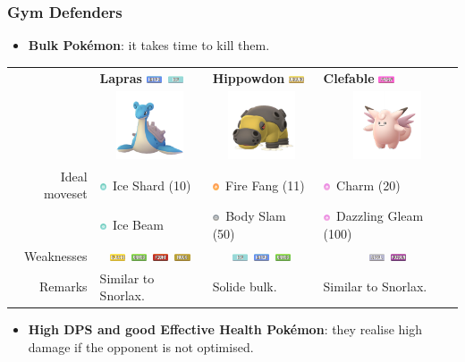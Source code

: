 \documentclass[12pt]{beamer}
\newcommand{\fightingfull}{\includegraphics[height=0.2cm]{../../images/type/full/Fighting.png}}
\newcommand{\electricfull}{\includegraphics[height=0.2cm]{../../images/type/full/Electric.png}}
\newcommand{\fairyfull}{\includegraphics[height=0.2cm]{../../images/type/full/Fairy.png}}
\newcommand{\grassfull}{\includegraphics[height=0.2cm]{../../images/type/full/Grass.png}}
\newcommand{\groundfull}{\includegraphics[height=0.2cm]{../../images/type/full/Ground.png}}
\newcommand{\icefull}{\includegraphics[height=0.2cm]{../../images/type/full/Ice.png}}
\newcommand{\rockfull}{\includegraphics[height=0.2cm]{../../images/type/full/Rock.png}}
\newcommand{\waterfull}{\includegraphics[height=0.2cm]{../../images/type/full/Water.png}}
\newcommand{\poisonfull}{\includegraphics[height=0.2cm]{../../images/type/full/Poison.png}}
\newcommand{\steelfull}{\includegraphics[height=0.2cm]{../../images/type/full/Steel.png}}
\newcommand{\icesimp}{\includegraphics[height=0.2cm]{../../images/type/simplified/ice.png}}
\newcommand{\firesimp}{\includegraphics[height=0.2cm]{../../images/type/simplified/fire.png}}
\newcommand{\fairysimp}{\includegraphics[height=0.2cm]{../../images/type/simplified/fairy.png}}
\newcommand{\normalsimp}{\includegraphics[height=0.2cm]{../../images/type/simplified/normal.png}}
\begin{document}
\begin{frame}
\frametitle{Gym Defenders}

\begin{block}{}
\begin{footnotesize}

\begin{itemize}
\item \textbf{Bulk Pok\'emon}: it takes time to kill them. 
\end{itemize}

\begin{tabular}{rp{3.2cm}p{3.2cm}p{3.2cm}}
& \textbf{Lapras} \hfill \waterfull~\icefull & \textbf{Hippowdon} \hfill \groundfull &  \textbf{Clefable} \hfill \fairyfull  \\ 
&\multicolumn{1}{c}{\includegraphics[width=2cm]{../../images/pokemon/Lapras}} &
\multicolumn{1}{c}{\includegraphics[width=2cm]{../../images/pokemon/Hippowdon}} &
\multicolumn{1}{c}{\includegraphics[width=2cm]{../../images/pokemon/Clefable}} \\ \hline
Ideal moveset & \icesimp~Ice Shard (10) & \firesimp~Fire Fang (11)&   \fairysimp~Charm (20)  \\
& \icesimp~Ice Beam & \normalsimp~Body Slam (50)&   \fairysimp~Dazzling Gleam (100) \\ \hline
Weaknesses &  \multicolumn{1}{c}{\electricfull~\grassfull~\fightingfull~\rockfull} & \multicolumn{1}{c}{\icefull~\waterfull~\grassfull} & \multicolumn{1}{c}{\steelfull~\poisonfull} \\ \hline
Remarks &  Similar to Snorlax.   & Solide bulk. & Similar to Snorlax.  \\
\end{tabular}



\begin{itemize}
  \item \textbf{High DPS and good Effective Health Pok\'emon}: they realise high damage if the opponent is not optimised. 
\end{itemize}


\end{footnotesize}
\end{block}
\end{frame}
\end{document}
